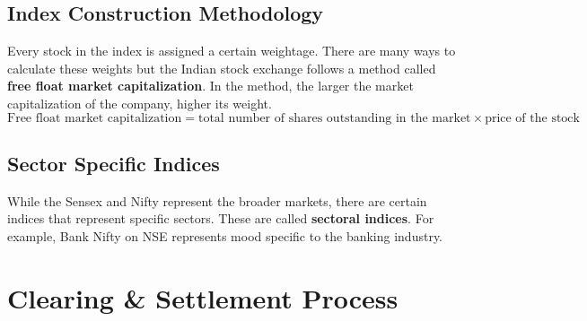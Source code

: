 \subsection{Index Construction Methodology}
Every stock in the index is assigned a certain weightage. There are many ways to calculate these weights but the Indian stock exchange follows a method called \textbf{free float market capitalization}. In the method, the larger the market capitalization of the company, higher its weight.
\[ \textrm{Free float market capitalization} = \textrm{total number of shares outstanding in the market} \times \textrm{price of the stock} \]

\subsection{Sector Specific Indices}
While the Sensex and Nifty represent the broader markets, there are certain indices that represent specific sectors. These are called \textbf{sectoral indices}. For example, Bank Nifty on NSE represents mood specific to the banking industry.

\section{Clearing \& Settlement Process}

